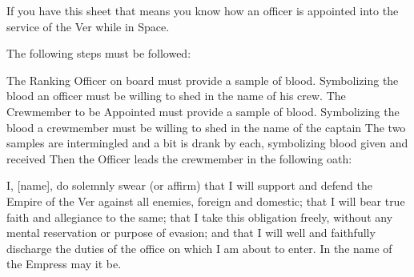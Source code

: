 \documentclass[green]{guildcamp4}
\begin{document}
\name{\gAppointing{}}

If you have this sheet that means you know how an officer is appointed into the service of the Ver while in Space. 

The following steps must be followed:

The Ranking Officer on board must provide a sample of blood. Symbolizing the blood an officer must be willing to shed in the name of his crew.
The Crewmember to be Appointed must provide a sample of blood. Symbolizing the blood a crewmember must be willing to shed in the name of the captain
The two samples are intermingled and a bit is drank by each, symbolizing blood given and received
Then the Officer leads the crewmember in the following oath:

I, [name], do solemnly swear (or affirm) that I will support and defend the Empire of the Ver against all enemies, foreign and domestic; that I will bear true faith and allegiance to the same; that I take this obligation freely, without any mental reservation or purpose of evasion; and that I will well and faithfully discharge the duties of the office on which I am about to enter. In the name of the Empress may it be.
\end{document}
